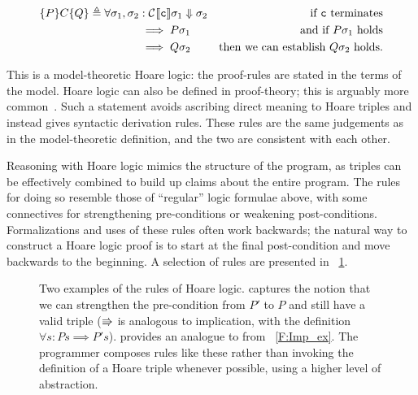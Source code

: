 \begin{align*}
    \{P\} C \{Q\} \definedas \forall \sigma_1, \sigma_2 &: \comp{c}\sigma_1 \DownTo \sigma_2 &\text{if \(\mathtt{c}\) terminates} \\
    &\implies P \sigma_1 &\text{and if \(P \sigma_1\) holds} \\
    &\implies Q \sigma_2 &\text{then we can establish \(Q \sigma_2\) holds.}
\end{align*}

This is a model-theoretic Hoare logic: the proof-rules are stated in the terms
of the model. Hoare logic can also be defined in proof-theory; this is arguably
more common~\cite[Ch. \emph{Hoare Logic as a Logic}]{Pierce:SF2}. Such a
statement avoids ascribing direct meaning to Hoare triples and instead gives
syntactic derivation rules. These rules are the same judgements as in the
model-theoretic definition, and the two are consistent with each other.

Reasoning with Hoare logic mimics the structure of the program,
as triples can be effectively combined to build up claims about the entire
program. The rules for doing so resemble those of ``regular'' logic formulae
above, with some connectives for strengthening pre-conditions or weakening
post-conditions. Formalizations and uses of these rules often work backwards;
the natural way to construct a Hoare logic proof is to start at the final
post-condition and move backwards to the beginning. A selection of rules are
presented in \figurename~\ref{F:Hoare_ex}.

\begin{figure}
    \centering
    \caption{Two examples of the rules of Hoare logic.
     captures the notion that we can strengthen the
    pre-condition from \(P'\) to \(P\) and still have a valid triple (\(\mathrel{\Rrightarrow}\) is
    analogous to implication, with the definition \(\forall s: P s \implies P'
    s\)).  provides an analogue to  from
    \figurename~\ref{F:Imp_ex}. The programmer composes rules like these rather
    than invoking the definition of a Hoare triple whenever possible, using a
    higher level of abstraction.}\label{F:Hoare_ex}
\end{figure}

